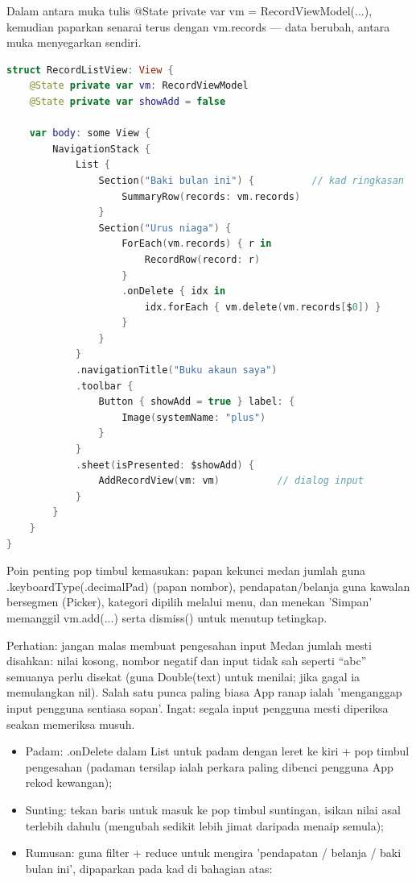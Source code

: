 Dalam antara muka tulis @State private var vm = RecordViewModel(...), kemudian paparkan senarai terus dengan vm.records — data berubah, antara muka menyegarkan sendiri.


\begin{lstlisting}[language=Swift]
struct RecordListView: View {
    @State private var vm: RecordViewModel
    @State private var showAdd = false

    var body: some View {
        NavigationStack {
            List {
                Section("Baki bulan ini") {          // kad ringkasan
                    SummaryRow(records: vm.records)
                }
                Section("Urus niaga") {
                    ForEach(vm.records) { r in
                        RecordRow(record: r)
                    }
                    .onDelete { idx in
                        idx.forEach { vm.delete(vm.records[$0]) }
                    }
                }
            }
            .navigationTitle("Buku akaun saya")
            .toolbar {
                Button { showAdd = true } label: {
                    Image(systemName: "plus")
                }
            }
            .sheet(isPresented: $showAdd) {
                AddRecordView(vm: vm)          // dialog input
            }
        }
    }
}
\end{lstlisting}

Poin penting pop timbul kemasukan: papan kekunci medan jumlah guna .keyboardType(.decimalPad) (papan nombor), pendapatan/belanja guna kawalan bersegmen (Picker), kategori dipilih melalui menu, dan menekan 'Simpan' memanggil vm.add(...) serta dismiss() untuk menutup tetingkap.

\begin{tcbwarn}{Perhatian: jangan malas membuat pengesahan input}
Medan jumlah mesti disahkan: nilai kosong, nombor negatif dan input tidak sah seperti “abc” semuanya perlu disekat (guna Double(text) untuk menilai; jika gagal ia memulangkan nil). Salah satu punca paling biasa App ranap ialah 'menganggap input pengguna sentiasa sopan'. Ingat: segala input pengguna mesti diperiksa seakan memeriksa musuh.

\end{tcbwarn}


\begin{itemize}
  \item Padam: .onDelete dalam List untuk padam dengan leret ke kiri + pop timbul pengesahan (padaman tersilap ialah perkara paling dibenci pengguna App rekod kewangan);
  \item Sunting: tekan baris untuk masuk ke pop timbul suntingan, isikan nilai asal terlebih dahulu (mengubah sedikit lebih jimat daripada menaip semula);
  \item Rumusan: guna filter + reduce untuk mengira 'pendapatan / belanja / baki bulan ini', dipaparkan pada kad di bahagian atas:
\end{itemize}


